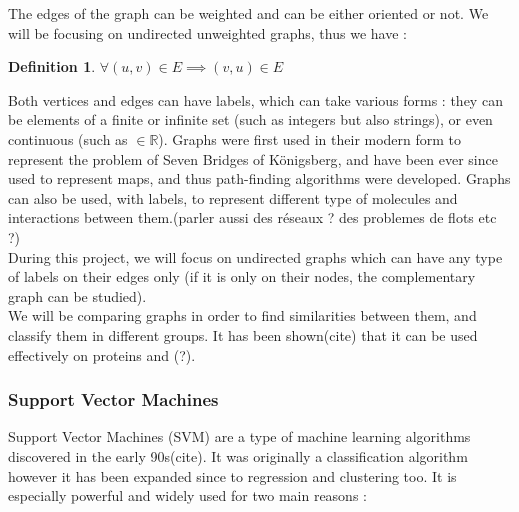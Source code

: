 \documentclass{article}
\newcommand*{\R}{%
  \mathbb{R}%
}
\theoremstyle{definition}
\newtheorem{definition}{Definition}[section]
\begin{document}
The edges of the graph can be weighted and can be either oriented or not. We will be focusing on undirected unweighted graphs, thus we have :
\begin{definition}
	$\forall (u,v) \in E \implies (v,u)\in E$
\end{definition}
Both vertices and edges can have labels, which can take various forms : they can be elements of a finite or infinite set (such as integers but also strings), or even continuous (such as $\in \R$).
Graphs were first used in their modern form to represent the problem of Seven Bridges of Königsberg\cite{konigsberg_wiki}, and have been ever since used to represent maps, and thus path-finding algorithms were developed. Graphs can also be used, with labels, to represent different type of molecules and interactions between them.(parler aussi des réseaux ? des problemes de flots etc ?)\\
During this project, we will focus on undirected graphs which can have any type of labels on their edges only (if it is only on their nodes, the complementary graph can be studied).\\
We will be comparing graphs in order to find similarities between them, and classify them in different groups. It has been shown(cite) that it can be used effectively on proteins and (?).
\subsubsection{Support Vector Machines}
Support Vector Machines (SVM) are a type of machine learning algorithms discovered in the early 90s(cite). It was originally a classification algorithm however it has been expanded since to regression and clustering too. It is especially powerful and widely used for two main reasons :
\end{document}
